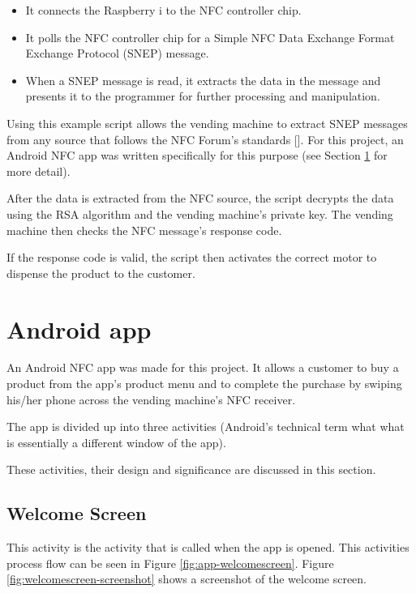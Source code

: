 \begin{itemize}
  \item It connects the Raspberry i to the NFC controller chip.
  \item It polls the NFC controller chip for a Simple NFC Data Exchange Format
  Exchange Protocol (SNEP) message.
  \item When a SNEP message is read, it extracts the data in the message and
  presents it to the programmer for further processing and manipulation.
\end{itemize}

Using this example script allows the vending machine to extract SNEP messages
from any source that follows the NFC Forum's standards
[\cite{website:nfc-forum}]. For this project, an Android NFC app was written
specifically for this purpose (see Section \ref{sec:nfc-android-app} for more
detail). 

After the data is extracted from the NFC source, the script decrypts the data
using the RSA algorithm and the vending machine's private key. The vending
machine then checks the NFC message's response code. 

If the response code is valid, the script then activates the correct motor to
dispense the product to the customer.

\section{Android app}
\label{sec:nfc-android-app}

An Android NFC app was made for this project. It allows a customer to buy a
product from the app's product menu and to complete the purchase by swiping
his/her phone across the vending machine's NFC receiver.

The app is divided up into three activities (Android's technical term what what
is essentially a different window of the app). 

These activities, their design and significance are discussed in this section.

\subsection{Welcome Screen}

This activity is the activity that is called when the app is opened. This
activities process flow can be seen in Figure \ref{fig:app-welcomescreen}.
Figure \ref{fig:welcomescreen-screenshot} shows a screenshot of the welcome
screen.

